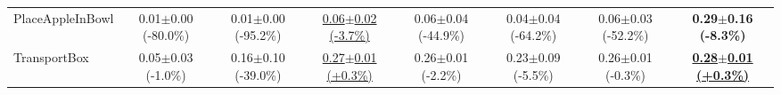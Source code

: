 \begin{table}[htbp]
\begin{adjustbox}{max width=\textwidth}
\begin{tabular}{l*{7}{c}}
PlaceAppleInBowl & 0.01$\pm$0.00 \scriptsize{(-80.0\%)} & 0.01$\pm$0.00 \scriptsize{(-95.2\%)} & \underline{0.06$\pm$0.02 \scriptsize{(-3.7\%)}} & 0.06$\pm$0.04 \scriptsize{(-44.9\%)} & 0.04$\pm$0.04 \scriptsize{(-64.2\%)} & 0.06$\pm$0.03 \scriptsize{(-52.2\%)} & \textbf{0.29$\pm$0.16 \scriptsize{(-8.3\%)}} \\
TransportBox & 0.05$\pm$0.03 \scriptsize{(-1.0\%)} & 0.16$\pm$0.10 \scriptsize{(-39.0\%)} & \underline{0.27$\pm$0.01 \scriptsize{(+0.3\%)}} & 0.26$\pm$0.01 \scriptsize{(-2.2\%)} & 0.23$\pm$0.09 \scriptsize{(-5.5\%)} & 0.26$\pm$0.01 \scriptsize{(-0.3\%)} & \textbf{\underline{0.28$\pm$0.01 \scriptsize{(+0.3\%)}}} \\
\bottomrule
\end{tabular}
\end{adjustbox}
\end{table}

